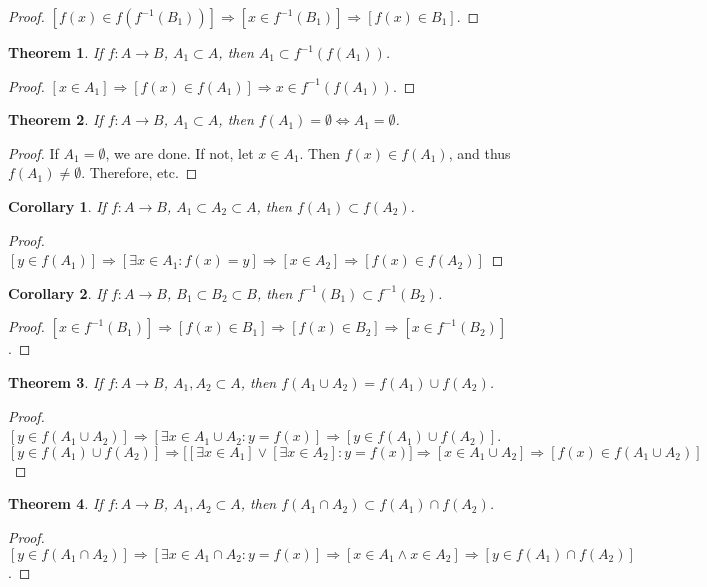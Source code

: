 \documentclass[crop=false,class=book]{standalone}
\theoremstyle{mystyle}
\newtheorem{theorem}{Theorem}[section]
\newtheorem{corollary}{Corollary}[section]
\begin{document}
\begin{proof}
$[f(x)\in f(f^{-1}(B_1))]\Rightarrow [x\in f^{-1}(B_1)]\Rightarrow [f(x)\in B_1]$.
\end{proof}
\begin{theorem}
If $f:A\rightarrow B$, $A_1\subset A$, then $A_1\subset f^{-1}(f(A_1))$.
\end{theorem}
\begin{proof}
$[x\in A_1]\Rightarrow [f(x) \in f(A_1)]\Rightarrow x\in f^{-1}(f(A_1))$.
\end{proof}
\begin{theorem}
If $f:A\rightarrow B$, $A_1\subset A$, then $f(A_1) = \emptyset \Leftrightarrow A_1 = \emptyset$.
\end{theorem}
\begin{proof}
If $A_1 = \emptyset$, we are done. If not, let $x\in A_1$. Then $f(x)\in f(A_1)$, and thus $f(A_1)\ne \emptyset$. Therefore, etc.
\end{proof}
\begin{corollary}
If $f:A\rightarrow B$, $A_1\subset A_2\subset A$, then $f(A_1)\subset f(A_2)$.
\end{corollary}
\begin{proof}
$[y\in f(A_1)]\Rightarrow[\exists x\in A_1:f(x)=y]\Rightarrow [x\in A_2] \Rightarrow [f(x)\in f(A_2)]$
\end{proof}
\begin{corollary}
If $f:A\rightarrow B$, $B_1\subset B_2\subset B$, then $f^{-1}(B_1)\subset f^{-1}(B_2)$.
\end{corollary}
\begin{proof}
$[x\in f^{-1}(B_1)] \Rightarrow [f(x) \in B_1] \Rightarrow [f(x) \in B_2]\Rightarrow [x\in f^{-1}(B_2)]$.
\end{proof}
\begin{theorem}
If $f:A\rightarrow B$, $A_1,A_2\subset A$, then $f(A_1 \cup A_2) = f(A_1)\cup f(A_2)$.
\end{theorem}
\begin{proof}
$[y\in f(A_1\cup A_2)]\Rightarrow [\exists x\in A_1 \cup A_2:y=f(x)]\Rightarrow [y \in f(A_1)\cup f(A_2)]$. $[y\in f(A_1)\cup f(A_2)]\Rightarrow \big[[\exists x\in A_1] \lor [\exists x\in A_2]: y=f(x)\big]\Rightarrow [x\in A_1\cup A_2]\Rightarrow [f(x)\in f(A_1\cup A_2)]$
\end{proof}
\begin{theorem}
If $f:A\rightarrow B$, $A_1,A_2\subset A$, then $f(A_1\cap A_2)\subset f(A_1)\cap f(A_2)$.
\end{theorem}
\begin{proof}
$[y\in f(A_1 \cap A_2)]\Rightarrow [\exists x\in A_1 \cap A_2:y=f(x)]\Rightarrow [x\in A_1 \land x \in A_2] \Rightarrow[y \in f(A_1)\cap f(A_2)]$.
\end{proof}
\end{document}
